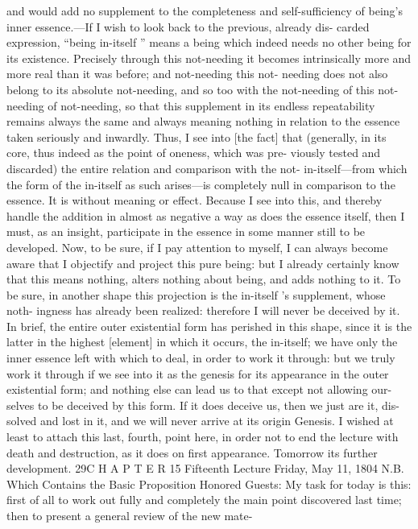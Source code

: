 and would add no supplement to the completeness and self-sufficiency of
being’s inner essence.—If I wish to look back to the previous, already dis-
carded expression, “being in-itself ” means a being which indeed needs no
other being for its existence. Precisely through this not-needing it becomes
intrinsically more and more real than it was before; and not-needing this not-
needing does not also belong to its absolute not-needing, and so too with the
not-needing of this not-needing of not-needing, so that this supplement in its
endless repeatability remains always the same and always meaning nothing in
relation to the essence taken seriously and inwardly. Thus, I see into [the fact]
that (generally, in its core, thus indeed as the point of oneness, which was pre-
viously tested and discarded) the entire relation and comparison with the not-
in-itself—from which the form of the in-itself as such arises—is completely
null in comparison to the essence. It is without meaning or effect. Because I
see into this, and thereby handle the addition in almost as negative a way as
does the essence itself, then I must, as an insight, participate in the essence in
some manner still to be developed.
Now, to be sure, if I pay attention to myself, I can always become aware
that I objectify and project this pure being: but I already certainly know that
this means nothing, alters nothing about being, and adds nothing to it. To be
sure, in another shape this projection is the in-itself ’s supplement, whose noth-
ingness has already been realized: therefore I will never be deceived by it. In
brief, the entire outer existential form has perished in this shape, since it is the
latter in the highest [element] in which it occurs, the in-itself; we have only the
inner essence left with which to deal, in order to work it through: but we truly
work it through if we see into it as the genesis for its appearance in the outer
existential form; and nothing else can lead us to that except not allowing our-
selves to be deceived by this form. If it does deceive us, then we just are it, dis-
solved and lost in it, and we will never arrive at its origin {Genesis}.
I wished at least to attach this last, fourth, point here, in order not to
end the lecture with death and destruction, as it does on first appearance.
Tomorrow its further development. 29C H A P T E R
15
Fifteenth Lecture
Friday, May 11, 1804
N.B. Which Contains the Basic Proposition
Honored Guests:
My task for today is this: first of all to work out fully and completely the main
point discovered last time; then to present a general review of the new mate-
